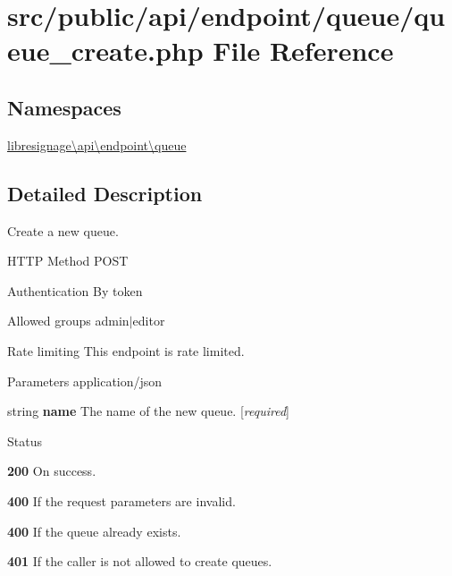 \hypertarget{src_2public_2api_2endpoint_2queue_2queue__create_8php}{}\section{src/public/api/endpoint/queue/queue\+\_\+create.php File Reference}
\label{src_2public_2api_2endpoint_2queue_2queue__create_8php}
\subsection*{Namespaces}
\begin{DoxyCompactItemize}
\item 
 \hyperlink{namespacelibresignage_1_1api_1_1endpoint_1_1queue}{libresignage\textbackslash{}api\textbackslash{}endpoint\textbackslash{}queue}
\end{DoxyCompactItemize}


\subsection{Detailed Description}
Create a new queue.

\begin{DoxyParagraph}{H\+T\+TP Method}
P\+O\+ST 
\end{DoxyParagraph}
\begin{DoxyParagraph}{Authentication}
By token 
\end{DoxyParagraph}
\begin{DoxyParagraph}{Allowed groups}
{\ttfamily admin$\vert$editor} 
\end{DoxyParagraph}
\begin{DoxyParagraph}{Rate limiting}
This endpoint is rate limited.
\end{DoxyParagraph}
\begin{DoxyParagraph}{Parameters}
application/json
\begin{DoxyItemize}
\item {\ttfamily string} {\bfseries name} The name of the new queue. \mbox{[}{\itshape required}\mbox{]}
\end{DoxyItemize}
\end{DoxyParagraph}
\begin{DoxyParagraph}{Status}

\begin{DoxyItemize}
\item {\bfseries 200} On success.
\item {\bfseries 400} If the request parameters are invalid.
\item {\bfseries 400} If the queue already exists.
\item {\bfseries 401} If the caller is not allowed to create queues. 
\end{DoxyItemize}
\end{DoxyParagraph}
